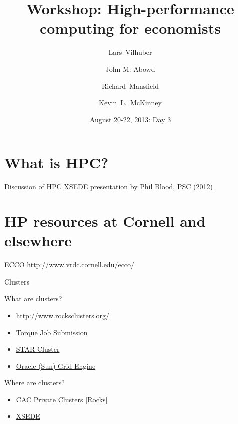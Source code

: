 \documentclass[xcolor=table,compress]{beamer}
\title[Computing for Economists]{Workshop: High-performance computing for economists}
\author[Vilhuber, Abowd, Mansfield, McKinney]{%
  Lars~Vilhuber\inst{1} \and
  John M. Abowd\inst{1} \and
  Richard~Mansfield\inst{1} \and
  Kevin~L.~McKinney %
}
\institute[Cornell]{
  \inst{1}%
   Cornell University, Economics Department,
}%
\date[August 20-22, 2013]{August 20-22, 2013: Day 3}
\begin{document}
\frame{\titlepage}
\section{What is HPC?}

\begin{frame}{Discussion of HPC}
\href{http://www.vrdc.cornell.edu/computing-for-economists/documents/XSEDE_ICE_2012.pdf}{XSEDE
 presentation by Phil Blood, PSC (2012)}
\end{frame}

\section[HP resources]{HP resources at Cornell and elsewhere}

\begin{frame}{ECCO}
\href{http://www2.vrdc.cornell.edu/ecco/}{http://www.vrdc.cornell.edu/ecco/}
\end{frame}

\begin{frame}{Clusters}
\begin{block}{What are clusters?}
\begin{itemize}
\item \href{http://www.rocksclusters.org/wordpress/}{http://www.rocksclusters.org/}
\item \href{http://www.clusterresources.com/torquedocs21/2.1jobsubmission.shtml}{Torque Job Submission}
\item \href{http://star.mit.edu/cluster/docs/latest/index.html}{STAR Cluster}
\item \href{http://www.oracle.com/us/products/tools/oracle-grid-engine-075549.html}{Oracle (Sun) Grid Engine}
\end{itemize}
\end{block}

\end{frame}

\begin{frame}{Where are clusters?}
\begin{itemize}
\item \href{http://www.cac.cornell.edu/services/hpcsystems.aspx}{CAC Private Clusters} [Rocks]
\item \href{https://www.xsede.org/}{XSEDE}
\end{itemize}
\end{frame}
\end{document}
